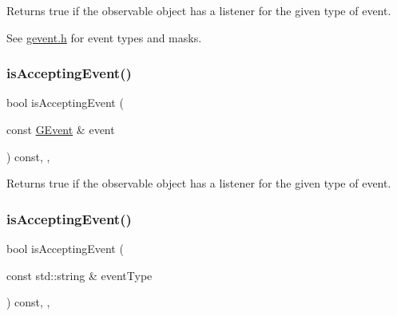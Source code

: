 Returns true if the observable object has a listener for the given type of event. 

See \mbox{\hyperlink{gevent_8h_source}{gevent.\+h}} for event types and masks. \mbox{\label{classsgl_1_1GObservable_aa31c73145a29dcb92848a92e0cfaea41}} 
\subsubsection{\texorpdfstring{is\+Accepting\+Event()}{isAcceptingEvent()}\hspace{0.1cm}{\footnotesize\ttfamily [2/3]}}
{\footnotesize\ttfamily bool is\+Accepting\+Event (\begin{DoxyParamCaption}\item[{const \mbox{\hyperlink{classsgl_1_1GEvent}{G\+Event}} \&}]{event }\end{DoxyParamCaption}) const\hspace{0.3cm}{\ttfamily [protected]}, {\ttfamily [virtual]}, {\ttfamily [inherited]}}



Returns true if the observable object has a listener for the given type of event. 

\mbox{\label{classsgl_1_1GObservable_a3b1c689267eda44e65a2213e7de38b23}} 
\subsubsection{\texorpdfstring{is\+Accepting\+Event()}{isAcceptingEvent()}\hspace{0.1cm}{\footnotesize\ttfamily [3/3]}}
{\footnotesize\ttfamily bool is\+Accepting\+Event (\begin{DoxyParamCaption}\item[{const std\+::string \&}]{event\+Type }\end{DoxyParamCaption}) const\hspace{0.3cm}{\ttfamily [protected]}, {\ttfamily [virtual]}, {\ttfamily [inherited]}}



